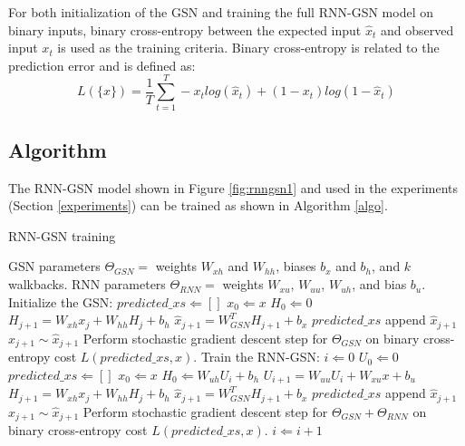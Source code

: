 For both initialization of the GSN and training the full RNN-GSN model on binary inputs, binary cross-entropy between the expected input $\hat{x}_t$ and observed input $x_t$ is used as the training criteria. Binary cross-entropy is related to the prediction error and is defined as:
\begin{equation}
L(\{x\}) = \frac{1}{T} \sum\limits_{t=1}^T -x_t log(\hat{x}_t) + (1-x_t) log(1-\hat{x}_t)
 \end{equation} 

\subsection{Algorithm}
The RNN-GSN model shown in Figure \ref{fig:rnngsn1} and used in the experiments (Section \ref{experiments}) can be trained as shown in Algorithm \ref{algo}.
\begin{algorithm}
\caption{RNN-GSN training}\label{algo}
\begin{algorithmic}
	\STATE GSN parameters $\Theta_{GSN} =$ weights $W_{xh}$ and $W_{hh}$, biases $b_x$ and $b_h$, and $k$ walkbacks.
	\STATE RNN parameters $\Theta_{RNN} =$ weights $W_{xu}$, $W_{uu}$, $W_{uh}$, and bias $b_u$.
	\STATE Initialize the GSN:
		\STATE $predicted\_xs \Leftarrow []$
		\STATE $x_0 \Leftarrow x$
		\STATE $H_0 \Leftarrow 0$
			\STATE $H_{j+1} = W_{xh}x_j + W_{hh}H_{j} + b_h$
			\STATE $\hat{x}_{j+1} = W_{GSN}^T H_{j+1} + b_x$
			\STATE $predicted\_xs$ append $\hat{x}_{j+1}$
			\STATE $x_{j+1}\sim \hat{x}_{j+1}$
		\ENDFOR
		\STATE Perform stochastic gradient descent step for $\Theta_{GSN}$ on binary cross-entropy cost $L(predicted\_xs, x)$.
	\ENDFOR
	\STATE Train the RNN-GSN:
	\STATE $i \Leftarrow 0$
	\STATE $U_0 \Leftarrow 0$
		\STATE $predicted\_xs \Leftarrow []$
		\STATE $x_0 \Leftarrow x$
		\STATE $H_0 \Leftarrow W_{uh}U_i + b_h$
		\STATE $U_{i+1} = W_{uu}U_i + W_{xu}x + b_u$
			\STATE $H_{j+1} = W_{xh}x_j + W_{hh}H_{j} + b_h$
			\STATE $\hat{x}_{j+1} = W_{GSN}^T H_{j+1} + b_x$
			\STATE $predicted\_xs$ append $\hat{x}_{j+1}$
			\STATE $x_{j+1}\sim \hat{x}_{j+1}$
		\ENDFOR
		\STATE Perform stochastic gradient descent step for $\Theta_{GSN} + \Theta_{RNN}$ on binary cross-entropy cost $L(predicted\_xs, x)$.
		\STATE $i \Leftarrow i+1$
	\ENDFOR
\end{algorithmic}
\end{algorithm}

